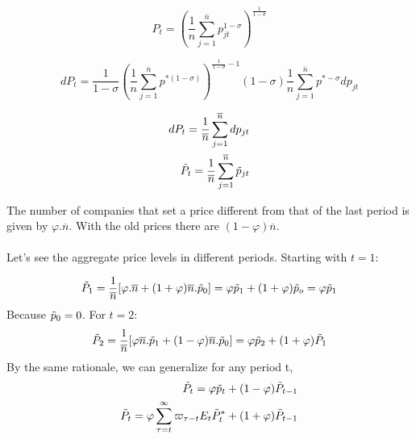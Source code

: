 \begin{equation*}
    P_{t}=(\frac{1}{n}\sum^{\overline{n}}_{j=1}p_{jt}^{1-\sigma})^{\frac{1}{1-\sigma}}
\end{equation*}

\begin{equation*}
      dP_{t}=\frac{1}{1-\sigma}(\frac{1}{n}\sum^{\overline{n}}_{j=1}p^{*(1-\sigma)})^{\frac{1}{1-\sigma}-1}(1-\sigma)\frac{1}{n}\sum^{\overline{n}}_{j=1}p^{*-\sigma}dp_{jt} 
\end{equation*}

\begin{equation*}
\begin{aligned}
    dP_{t}=\frac{1}{\overline{n}}\sum^{\overline{n}}_{j=1}dp_{jt} \\
    \Tilde{P}_{t}=\frac{1}{\overline{n}}\sum^{\overline{n}}_{j=1}\Tilde{p}_{jt}
\end{aligned}
\end{equation*}

The number of companies that set a price different from that of the last period is given by $\varphi.\overline{n}$. With the old prices there are $(1-\varphi)\overline{n}$.

\paragraph{}
Let's see the aggregate price levels in different periods. Starting with $t=1$:

\begin{equation*}
    \Tilde{P}_{1}=\frac{1}{\overline{n}}[\varphi.\overline{n}+(1+\varphi)\overline{n}.\Tilde{p}_{0}]=\varphi\Tilde{p}_{1}+(1+\varphi)\Tilde{p}_{o}=\varphi\Tilde{p}_{1}
\end{equation*}
Because $\Tilde{p}_{0}=0$.
For $t=2$:
\begin{equation*}
    \Tilde{P}_{2}=\frac{1}{\overline{n}}[\varphi\overline{n}.\Tilde{p}_{1}+(1-\varphi)\overline{n}.\Tilde{p}_{0}]=\varphi\Tilde{p}_{2}+(1+\varphi)\Tilde{P}_{1}
\end{equation*}
By the same rationale, we can generalize for any period t, 
\begin{equation} \label{Price_aggregate_Calvo}
\begin{aligned}
    \Tilde{P}_{t}=\varphi\Tilde{p}_{t}+(1-\varphi)\Tilde{P}_{t-1} \\
    \Tilde{P}_{t}=\varphi\sum^{\infty}_{\tau=t}\varpi_{\tau-t}E_{t}\Tilde{P}_{t}^{*}+(1+\varphi)\Tilde{P}_{t-1}
\end{aligned}
\end{equation}

